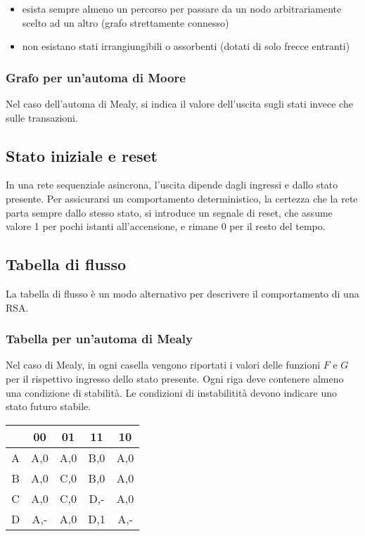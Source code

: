 \documentclass{subfiles}
\begin{document}
\begin{itemize}
    \item esista sempre almeno un percorso per passare da un nodo arbitrariamente scelto ad un altro (grafo strettamente connesso)
    \item non esistano stati irrangiungibili o assorbenti (dotati di solo frecce entranti)
\end{itemize}

\subsubsection{Grafo per un'automa di Moore}

Nel caso dell'automa di Mealy, si indica il valore dell'uscita sugli stati invece che sulle transazioni.

\subsection{Stato iniziale e reset}

In una rete sequenziale asincrona, l'uscita dipende dagli ingressi e dallo stato presente.
Per assicurarsi un comportamento deterministico, la certezza che la rete parta sempre dallo stesso stato, si introduce un segnale di reset, che assume valore 1 per pochi istanti all'accensione, e rimane 0 per il resto del tempo.

\subsection{Tabella di flusso}

La tabella di flusso è un modo alternativo per descrivere il comportamento di una RSA.

\subsubsection{Tabella per un'automa di Mealy}

Nel caso di Mealy, in ogni casella vengono riportati i valori delle funzioni $F$ e $G$ per il rispettivo ingresso dello stato presente.
Ogni riga deve contenere almeno una condizione di stabilità.
Le condizioni di instabilitità devono indicare uno stato futuro stabile.

\begin{center}
\begin{tabular}{ |c|c|c|c|c| }
\hline
& 00 & 01 & 11 & 10 \\
\hline
\hline
A & A,0 & A,0 & B,0 & A,0 \\
B & A,0 & C,0 & B,0 & A,0 \\
C & A,0 & C,0 & D,- & A,0 \\
D & A,- & A,0 & D,1 & A,- \\
\hline
\end{tabular}
\end{center}
\end{document}
